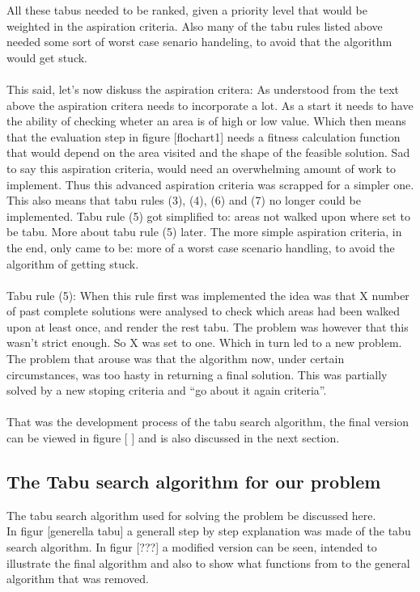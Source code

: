 All these tabus needed to be ranked, given a priority level that would be weighted in the aspiration criteria. Also many of the tabu rules listed above needed some sort of worst case senario handeling, to avoid that the algorithm would get stuck.\\
\\This said, let's now diskuss the aspiration critera:
As understood from the text above the aspiration critera needs to incorporate a lot. As a start it needs to have the ability of checking wheter an area is of high or low value. Which then means that the evaluation step in figure [flochart1] needs a fitness calculation function that would depend on the area visited and the shape of the feasible solution. Sad to say this aspiration criteria, would need an overwhelming amount of work to implement. Thus this advanced aspiration criteria was scrapped for a simpler one. This also means that tabu rules (3), (4), (6) and (7) no longer could be implemented. Tabu rule (5) got simplified to:  areas not walked upon where set to be tabu. More about tabu rule (5) later. The more simple aspiration criteria, in the end, only came to be: more of a worst case scenario handling, to avoid the algorithm of getting stuck.\\
\\Tabu rule (5): When this rule first was implemented the idea was that X number of past complete solutions were analysed to check which areas had been walked upon at least once, and render the rest tabu. The problem was however that this wasn't strict enough. So X was set to one. Which in turn led to a new problem. The problem that arouse was that the algorithm now, under certain circumstances, was too hasty in returning a final solution. This was partially solved by a new stoping criteria and ``go about it again criteria''.\\
\\
That was the development process of the tabu search algorithm, the final version can be viewed in figure [ ] and is also discussed in the next section.\\
\subsection{The Tabu search algorithm for our problem}


The tabu search algorithm used for solving the problem be discussed here.\\
In figur [generella tabu] a generall step by step explanation was made of the tabu search algorithm. In figur [???] a modified version can be seen, intended to illustrate the final algorithm and also to show what functions from to the general algorithm that was removed.\\

